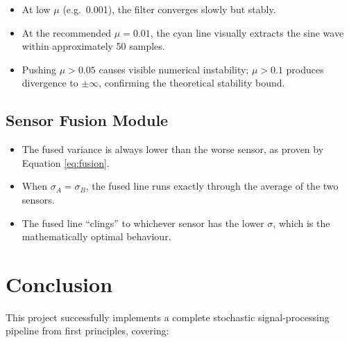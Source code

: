 \documentclass[12pt, a4paper]{article}
\begin{document}
\begin{itemize}
  \item At low $\mu$ (e.g.\ 0.001), the filter converges slowly but stably.
  \item At the recommended $\mu = 0.01$, the cyan line visually extracts the sine
        wave within approximately 50 samples.
  \item Pushing $\mu > 0.05$ causes visible numerical instability; $\mu > 0.1$
        produces divergence to $\pm\infty$, confirming the theoretical stability bound.
\end{itemize}

\subsection{Sensor Fusion Module}

\begin{itemize}
  \item The fused variance is always lower than the worse sensor, as proven by
        Equation \eqref{eq:fusion}.
  \item When $\sigma_A = \sigma_B$, the fused line runs exactly through the average
        of the two sensors.
  \item The fused line ``clings'' to whichever sensor has the lower $\sigma$, which
        is the mathematically optimal behaviour.
\end{itemize}

\section{Conclusion}

This project successfully implements a complete stochastic signal-processing pipeline
from first principles, covering:
\end{document}
